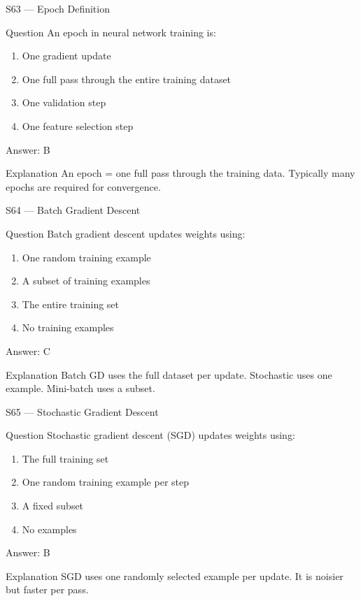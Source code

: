 \documentclass[aspectratio=169,8pt]{beamer}
\begin{document}
	\begin{frame}{S63 --- Epoch Definition}
		\begin{block}{Question}
			An epoch in neural network training is:
			\begin{enumerate}
				\item One gradient update
				\item One full pass through the entire training dataset
				\item One validation step
				\item One feature selection step
			\end{enumerate}
		\end{block}
		\begin{exampleblock}{Answer: B}\end{exampleblock}
		\begin{block}{Explanation}
			An epoch = one full pass through the training data. Typically many epochs are required for convergence.
		\end{block}
	\end{frame}
	
	\begin{frame}{S64 --- Batch Gradient Descent}
		\begin{block}{Question}
			Batch gradient descent updates weights using:
			\begin{enumerate}
				\item One random training example
				\item A subset of training examples
				\item The entire training set
				\item No training examples
			\end{enumerate}
		\end{block}
		\begin{exampleblock}{Answer: C}\end{exampleblock}
		\begin{block}{Explanation}
			Batch GD uses the full dataset per update. Stochastic uses one example. Mini-batch uses a subset.
		\end{block}
	\end{frame}
	
	\begin{frame}{S65 --- Stochastic Gradient Descent}
		\begin{block}{Question}
			Stochastic gradient descent (SGD) updates weights using:
			\begin{enumerate}
				\item The full training set
				\item One random training example per step
				\item A fixed subset
				\item No examples
			\end{enumerate}
		\end{block}
		\begin{exampleblock}{Answer: B}\end{exampleblock}
		\begin{block}{Explanation}
			SGD uses one randomly selected example per update. It is noisier but faster per pass.
		\end{block}
	\end{frame}
	
\end{document}
